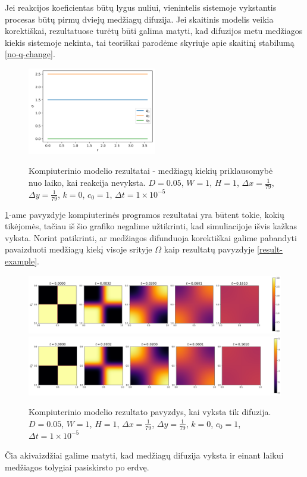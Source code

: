 Jei reakcijos koeficientas būtų lygus nuliui, vienintelis sistemoje vykstantis procesas būtų pirmų dviejų medžiagų difuzija. Jei skaitinis modelis veikia korektiškai, rezultatuose turėtų būti galima matyti, kad difuzijos metu medžiagos kiekis sistemoje nekinta, tai teoriškai parodėme skyriuje apie skaitinį stabilumą \eqref{no-q-change}.

\newpage

\begin{figure}[h!]
    \centering
    \caption{Kompiuterinio modelio rezultatai - medžiagų kiekių priklausomybė nuo laiko, kai reakcija nevyksta. $D = 0.05$, $W = 1$, $H = 1$, $\Delta x = \frac{1}{79}$, $\Delta y = \frac{1}{79}$, $k = 0$, $c_0 = 1$, $\Delta t = 1\times 10^{-5}$ }
    \includegraphics[width=0.5\textwidth]{../assets/no-reaction.png}
    \label{no-reaction}
\end{figure}

\ref{no-reaction}-ame pavyzdyje kompiuterinės programos rezultatai yra būtent tokie, kokių tikėjomės, tačiau iš šio grafiko negalime užtikrinti, kad simuliacijoje išvis kažkas vyksta. Norint patikrinti, ar medžiagos difunduoja korektiškai galime pabandyti pavaizduoti medžiagų kiekį visoje srityje $\Omega$ kaip rezultatų pavyzdyje \eqref{result-example}.

\begin{figure}[h!]
\centering
\caption{Kompiuterinio modelio rezultato pavyzdys, kai vyksta tik difuzija. $D = 0.05$, $W = 1$, $H = 1$, $\Delta x = \frac{1}{79}$, $\Delta y = \frac{1}{79}$, $k = 0$, $c_0 = 1$, $\Delta t = 1\times 10^{-5}$ }
\includegraphics[width=\textwidth]{../assets/only-diffusion-c1.png} \\
\includegraphics[width=\textwidth]{../assets/only-diffusion-c2.png}
\label{only-diffusion}
\end{figure}

Čia akivaizdžiai galime matyti, kad medžiagų difuzija vyksta ir einant laikui medžiagos tolygiai pasiskirsto po erdvę.


